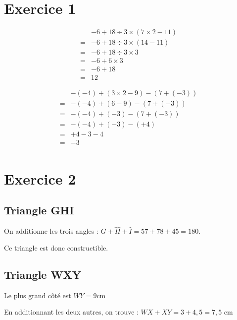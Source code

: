 \section*{Exercice 1}

\begin{minipage}{0.45\textwidth}
    \begin{align*}
        &-6+18\div 3\times (7\times2-11)\\
        =&-6+18\div 3\times (14-11)\\
        =&-6+18\div 3\times 3\\
        =&-6+6\times 3\\
        =&-6+18\\
        =&12
    \end{align*}
    
\end{minipage}
\hfil
\vrule
\hfil
\begin{minipage}{0.45\textwidth}
    \begin{align*}
        &-(-4)+(3\times2-9)-(7+(-3))\\
        =&-(-4)+(6-9)-(7+(-3))\\
        =&-(-4)+(-3)-(7+(-3))\\
        =&-(-4)+(-3)-(+4)\\
        =&+4-3-4\\
        =&-3\\
    \end{align*}
\end{minipage}

\section*{Exercice 2}

\subsection*{Triangle GHI}  
On additionne les trois angles : $\widehat{G}+\widehat{H}+\widehat{I}=57+78+45=180$.

Ce triangle est donc constructible.


\subsection*{Triangle WXY} 
Le plus grand côté est $WY=9$cm

En additionnant les deux autres, on trouve : $WX+XY=3+4,5=7,5$ cm

